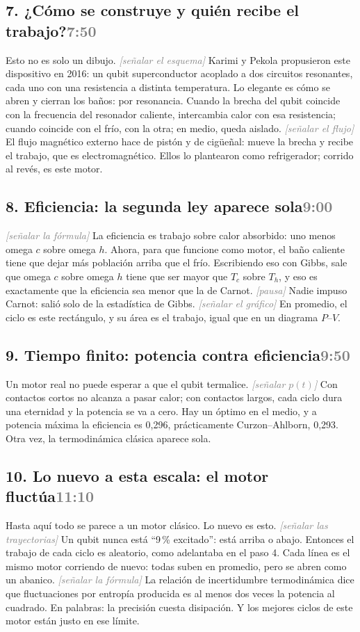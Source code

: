 \documentclass[11pt,a4paper]{article}
\newcommand{\acc}[1]{\textcolor{gray}{\textit{[#1]}}}
\newcommand{\slide}[2]{\subsection{#1\hfill\normalfont\small\textcolor{gray}{#2}}}
\begin{document}
\slide{7. ¿Cómo se construye y quién recibe el trabajo?}{7:50}
Esto no es solo un dibujo. \acc{señalar el esquema} Karimi y Pekola propusieron este dispositivo en 2016: un qubit superconductor acoplado a dos circuitos resonantes, cada uno con una resistencia a distinta temperatura. Lo elegante es cómo se abren y cierran los baños: por resonancia. Cuando la brecha del qubit coincide con la frecuencia del resonador caliente, intercambia calor con esa resistencia; cuando coincide con el frío, con la otra; en medio, queda aislado. \acc{señalar el flujo} El flujo magnético externo hace de pistón y de cigüeñal: mueve la brecha y recibe el trabajo, que es electromagnético. Ellos lo plantearon como refrigerador; corrido al revés, es este motor.

\slide{8. Eficiencia: la segunda ley aparece sola}{9:00}
\acc{señalar la fórmula} La eficiencia es trabajo sobre calor absorbido: uno menos omega $c$ sobre omega $h$. Ahora, para que funcione como motor, el baño caliente tiene que dejar más población arriba que el frío. Escribiendo eso con Gibbs, sale que omega $c$ sobre omega $h$ tiene que ser mayor que $T_c$ sobre $T_h$, y eso es exactamente que la eficiencia sea menor que la de Carnot. \acc{pausa} Nadie impuso Carnot: salió solo de la estadística de Gibbs. \acc{señalar el gráfico} En promedio, el ciclo es este rectángulo, y su área es el trabajo, igual que en un diagrama $P$--$V$.

\slide{9. Tiempo finito: potencia contra eficiencia}{9:50}
Un motor real no puede esperar a que el qubit termalice. \acc{señalar $p(t)$} Con contactos cortos no alcanza a pasar calor; con contactos largos, cada ciclo dura una eternidad y la potencia se va a cero. Hay un óptimo en el medio, y a potencia máxima la eficiencia es 0,296, prácticamente Curzon--Ahlborn, 0,293. Otra vez, la termodinámica clásica aparece sola.

\slide{10. Lo nuevo a esta escala: el motor fluctúa}{11:10}
Hasta aquí todo se parece a un motor clásico. Lo nuevo es esto. \acc{señalar las trayectorias} Un qubit nunca está ``9\,\% excitado'': está arriba o abajo. Entonces el trabajo de cada ciclo es aleatorio, como adelantaba en el paso 4. Cada línea es el mismo motor corriendo de nuevo: todas suben en promedio, pero se abren como un abanico. \acc{señalar la fórmula} La relación de incertidumbre termodinámica dice que fluctuaciones por entropía producida es al menos dos veces la potencia al cuadrado. En palabras: la precisión cuesta disipación. Y los mejores ciclos de este motor están justo en ese límite.
\end{document}

